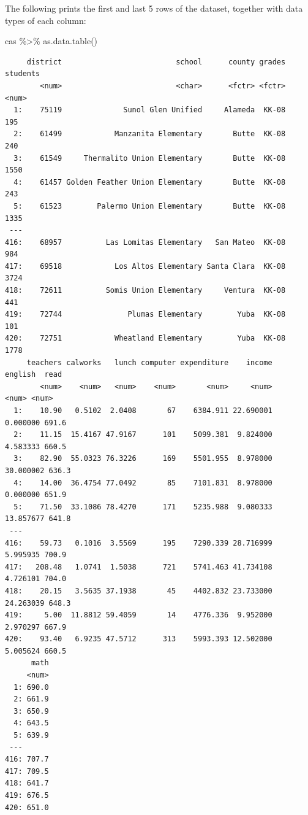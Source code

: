 \documentclass[
  12pt,
  letterpaper,
]{scrbook}
\newenvironment{Shaded}{\begin{snugshade}}{\end{snugshade}}
\newcommand{\FunctionTok}[1]{\textcolor[rgb]{0.28,0.35,0.67}{#1}}
\newcommand{\NormalTok}[1]{\textcolor[rgb]{0.00,0.23,0.31}{#1}}
\newcommand{\SpecialCharTok}[1]{\textcolor[rgb]{0.37,0.37,0.37}{#1}}
\theoremstyle{plain}
\theoremstyle{definition}
\theoremstyle{remark}
\begin{document}
The following prints the first and last 5 rows of the dataset, together
with data types of each column:

\begin{Shaded}
\begin{Highlighting}[]
\NormalTok{cas }\SpecialCharTok{\%\textgreater{}\%} \FunctionTok{as.data.table}\NormalTok{()}
\end{Highlighting}
\end{Shaded}

\begin{verbatim}
     district                          school      county grades students
        <num>                          <char>      <fctr> <fctr>    <num>
  1:    75119              Sunol Glen Unified     Alameda  KK-08      195
  2:    61499            Manzanita Elementary       Butte  KK-08      240
  3:    61549     Thermalito Union Elementary       Butte  KK-08     1550
  4:    61457 Golden Feather Union Elementary       Butte  KK-08      243
  5:    61523        Palermo Union Elementary       Butte  KK-08     1335
 ---                                                                     
416:    68957          Las Lomitas Elementary   San Mateo  KK-08      984
417:    69518            Los Altos Elementary Santa Clara  KK-08     3724
418:    72611          Somis Union Elementary     Ventura  KK-08      441
419:    72744               Plumas Elementary        Yuba  KK-08      101
420:    72751            Wheatland Elementary        Yuba  KK-08     1778
     teachers calworks   lunch computer expenditure    income   english  read
        <num>    <num>   <num>    <num>       <num>     <num>     <num> <num>
  1:    10.90   0.5102  2.0408       67    6384.911 22.690001  0.000000 691.6
  2:    11.15  15.4167 47.9167      101    5099.381  9.824000  4.583333 660.5
  3:    82.90  55.0323 76.3226      169    5501.955  8.978000 30.000002 636.3
  4:    14.00  36.4754 77.0492       85    7101.831  8.978000  0.000000 651.9
  5:    71.50  33.1086 78.4270      171    5235.988  9.080333 13.857677 641.8
 ---                                                                         
416:    59.73   0.1016  3.5569      195    7290.339 28.716999  5.995935 700.9
417:   208.48   1.0741  1.5038      721    5741.463 41.734108  4.726101 704.0
418:    20.15   3.5635 37.1938       45    4402.832 23.733000 24.263039 648.3
419:     5.00  11.8812 59.4059       14    4776.336  9.952000  2.970297 667.9
420:    93.40   6.9235 47.5712      313    5993.393 12.502000  5.005624 660.5
      math
     <num>
  1: 690.0
  2: 661.9
  3: 650.9
  4: 643.5
  5: 639.9
 ---      
416: 707.7
417: 709.5
418: 641.7
419: 676.5
420: 651.0
\end{verbatim}
\end{document}
